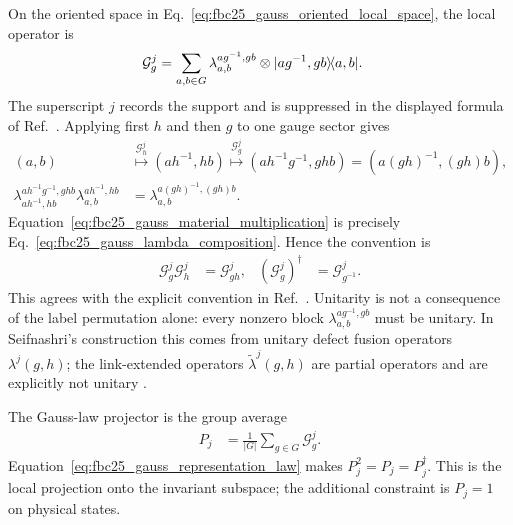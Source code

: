 \documentclass{article}
\begin{document}
On the oriented space in
Eq.~\ref{eq:fbc25_gauss_oriented_local_space}, the local operator is
\begin{align}
    \mathcal G^j_g
        &=\sum_{a,b\in G}
          \lambda_{a,b}^{ag^{-1},gb}
          \otimes|ag^{-1},gb\rangle\!\langle a,b|.
    \label{eq:fbc25_gauss_local_representation}
\end{align}
The superscript $j$ records the support and is suppressed in the displayed
formula  of
Ref.~\cite[lines~3380--3386]{FrancoRubio2025MPUGauging}.  Applying first $h$
and then $g$ to one gauge sector gives
\begin{align}
    (a,b)
        &\overset{\mathcal G^j_h}{\longmapsto}(ah^{-1},hb)
         \overset{\mathcal G^j_g}{\longmapsto}
         (ah^{-1}g^{-1},ghb)
         =(a(gh)^{-1},(gh)b),
    \label{eq:fbc25_gauss_sector_multiplication}\\
    \lambda_{ah^{-1},hb}^{ah^{-1}g^{-1},ghb}
      \lambda_{a,b}^{ah^{-1},hb}
        &=\lambda_{a,b}^{a(gh)^{-1},(gh)b}.
    \label{eq:fbc25_gauss_material_multiplication}
\end{align}
Equation~\ref{eq:fbc25_gauss_material_multiplication} is precisely
Eq.~\ref{eq:fbc25_gauss_lambda_composition}.  Hence the convention is
\begin{align}
    \mathcal G^j_g\mathcal G^j_h
        &=\mathcal G^j_{gh},
    &
    (\mathcal G^j_g)^\dagger
        &=\mathcal G^j_{g^{-1}}.
    \label{eq:fbc25_gauss_representation_law}
\end{align}
This agrees with the explicit convention in
Ref.~\cite[arXiv source lines~1691--1734]{Seifnashri2024LSM}.  Unitarity is
not a consequence of the label permutation alone: every nonzero block
$\lambda_{a,b}^{ag^{-1},gb}$ must be unitary.  In Seifnashri's construction
this comes from unitary defect fusion operators $\lambda^j(g,h)$; the
link-extended operators $\widetilde\lambda^j(g,h)$ are partial operators and
are explicitly not unitary \cite[arXiv source lines~709--744 and
1680--1729]{Seifnashri2024LSM}.

The Gauss-law projector is the group average
\begin{align}
    P_j
        &=\frac{1}{|G|}\sum_{g\in G}\mathcal G^j_g.
    \label{eq:fbc25_gauss_projector}
\end{align}
Equation~\ref{eq:fbc25_gauss_representation_law} makes
$P_j^2=P_j=P_j^\dagger$.  This is the local projection onto the invariant
subspace; the additional constraint is $P_j=1$ on physical states.
\end{document}
